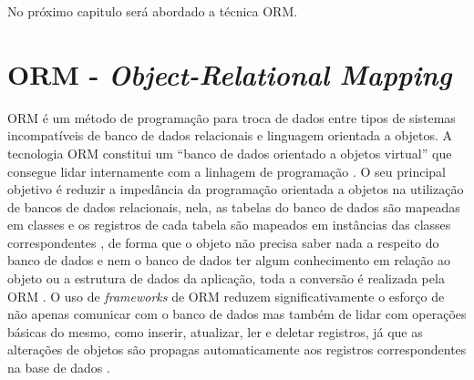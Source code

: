 No próximo capitulo será abordado a técnica ORM.
\section{ORM - \textit{Object-Relational Mapping}}

ORM é um método de programação para troca de dados entre tipos de sistemas incompatíveis de banco de dados relacionais e linguagem orientada a objetos. A tecnologia ORM constitui um ``banco de dados orientado a objetos virtual'' que consegue lidar internamente com a linhagem de programação \cite{nazario2019detecting}. O seu principal objetivo é reduzir a impedância da programação orientada a objetos na utilização de bancos de dados relacionais, nela, as tabelas do banco de dados são mapeadas em classes e os registros de cada tabela são mapeados em instâncias das classes correspondentes \cite{michalsky2012componentes}, de forma que o objeto não precisa saber nada a respeito do banco de dados e nem o banco de dados ter algum conhecimento em relação ao objeto ou a estrutura de dados da aplicação, toda a conversão é realizada pela ORM \cite{fayyaz2014performance}.
O uso de \textit{frameworks} de ORM reduzem significativamente o esforço de não apenas comunicar com o banco de dados mas também de lidar com operações básicas do mesmo, como inserir, atualizar, ler e deletar registros, já que as alterações de objetos são propagas automaticamente aos registros correspondentes na base de dados \cite{nazario2019detecting}.